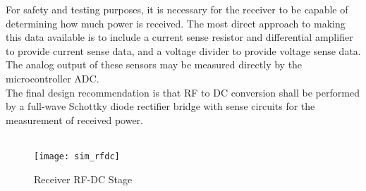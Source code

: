 \documentclass[12pt]{article}
\begin{document}
\indent
For safety and testing purposes, it is necessary for the receiver to be capable of determining how much power is received. The most direct approach to making this data available is to include a current sense resistor and differential amplifier to provide current sense data, and a voltage divider to provide voltage sense data. The analog output of these sensors may be measured directly by the microcontroller ADC.\\

\indent
The final design recommendation is that RF to DC conversion shall be performed by a full-wave Schottky diode rectifier bridge with sense circuits for the measurement of received power.\\

\hfill \\
\begin{figure}[h!]
\centering
\texttt{[image: sim\_rfdc]}
\caption{Receiver RF-DC Stage}
\end{figure}\\
\hfill \\
\end{document}
